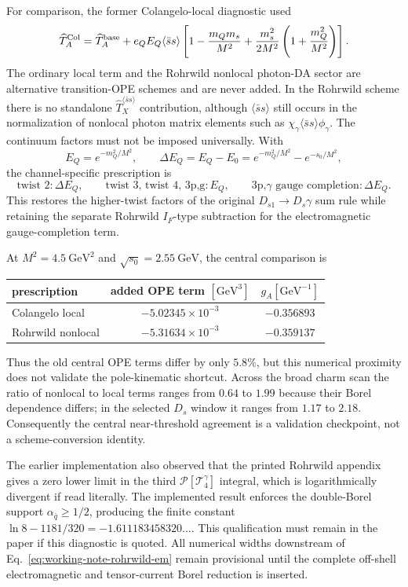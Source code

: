 \documentclass[11pt]{article}
\newcommand{\GeV}{\mathrm{GeV}}
\begin{document}
For comparison, the former Colangelo-local diagnostic used
\begin{equation}
 \widehat T_A^{\rm Col}=\widehat T_A^{\rm base}
 +e_QE_Q\langle\bar ss\rangle
 \left[1-\frac{m_Qm_s}{M^2}
 +\frac{m_s^2}{2M^2}\left(1+\frac{m_Q^2}{M^2}\right)\right].
\end{equation}
The ordinary local term and the Rohrwild nonlocal photon-DA sector are
alternative transition-OPE schemes and are never added.  In the Rohrwild
scheme there is no standalone
$\widehat T_X^{\langle\bar ss\rangle}$ contribution, although
$\langle\bar ss\rangle$ still occurs in the normalization of nonlocal photon
matrix elements such as
$\chi_\gamma\langle\bar ss\rangle\phi_\gamma$.
The continuum factors must not be imposed universally.  With
\begin{equation}
 E_Q=e^{-m_Q^2/M^2},\qquad
 \Delta E_Q=E_Q-E_0
 =e^{-m_Q^2/M^2}-e^{-s_0/M^2},
\end{equation}
the channel-specific prescription is
\[
 \text{twist 2}:\Delta E_Q,\qquad
 \text{twist 3, twist 4, 3p,g}:E_Q,\qquad
 \text{3p,\(\gamma\) gauge completion}:\Delta E_Q .
\]
This restores the higher-twist factors of the original
$D_{s1}\to D_s\gamma$ sum rule while retaining the separate Rohrwild
$I_F$-type subtraction for the electromagnetic gauge-completion term.

At $M^2=4.5~\GeV^2$ and $\sqrt{s_0}=2.55~\GeV$, the central comparison is
\begin{center}
\begin{tabular}{lcc}
\toprule
prescription & added OPE term $[\GeV^3]$ & $g_A[\GeV^{-1}]$\\
\midrule
Colangelo local & $-5.02345\times10^{-3}$ & $-0.356893$\\
Rohrwild nonlocal & $-5.31634\times10^{-3}$ & $-0.359137$\\
\bottomrule
\end{tabular}
\end{center}
Thus the old central OPE terms differ by only $5.8\%$, but this numerical
proximity does not validate the pole-kinematic shortcut.  Across the broad charm scan the
ratio of nonlocal to local terms ranges from $0.64$ to $1.99$ because their
Borel dependence differs; in the selected $D_s$ window it ranges from $1.17$
to $2.18$.  Consequently the central near-threshold agreement is a validation
checkpoint, not a scheme-conversion identity.

The earlier implementation also observed that the printed Rohrwild appendix gives a zero lower limit in the third
$\mathcal P[\mathcal T_4^\gamma]$ integral, which is logarithmically divergent
if read literally.  The implemented result enforces the double-Borel support
$\alpha_{\bar q}\geq1/2$, producing the finite constant
$\ln8-1181/320=-1.611183458320\ldots$.  This qualification must remain in the
paper if this diagnostic is quoted.  All numerical widths downstream of
Eq.~\eqref{eq:working-note-rohrwild-em} remain provisional until the complete
off-shell electromagnetic and tensor-current Borel reduction is inserted.
\end{document}
